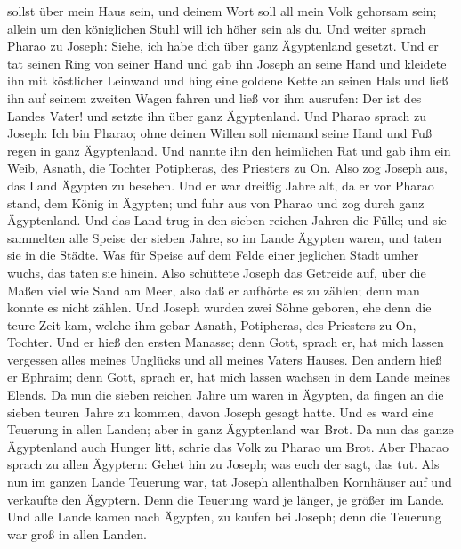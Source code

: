 sollst über mein Haus sein, und deinem Wort soll all mein Volk gehorsam
sein; allein um den königlichen Stuhl will ich höher sein als du.
 Und weiter sprach Pharao zu Joseph: Siehe, ich habe dich
über ganz Ägyptenland gesetzt.  Und er tat seinen Ring von
seiner Hand und gab ihn Joseph an seine Hand und kleidete ihn mit
köstlicher Leinwand und hing eine goldene Kette an seinen Hals
 und ließ ihn auf seinem zweiten Wagen fahren und ließ vor
ihm ausrufen: Der ist des Landes Vater! und setzte ihn über ganz
Ägyptenland.  Und Pharao sprach zu Joseph: Ich bin Pharao;
ohne deinen Willen soll niemand seine Hand und Fuß regen in ganz
Ägyptenland.  Und nannte ihn den heimlichen Rat und gab ihm
ein Weib, Asnath, die Tochter Potipheras, des Priesters zu On. Also zog
Joseph aus, das Land Ägypten zu besehen.  Und er war
dreißig Jahre alt, da er vor Pharao stand, dem König in Ägypten; und
fuhr aus von Pharao und zog durch ganz Ägyptenland.  Und
das Land trug in den sieben reichen Jahren die Fülle;  und
sie sammelten alle Speise der sieben Jahre, so im Lande Ägypten waren,
und taten sie in die Städte. Was für Speise auf dem Felde einer
jeglichen Stadt umher wuchs, das taten sie hinein.  Also
schüttete Joseph das Getreide auf, über die Maßen viel wie Sand am Meer,
also daß er aufhörte es zu zählen; denn man konnte es nicht zählen.
 Und Joseph wurden zwei Söhne geboren, ehe denn die teure
Zeit kam, welche ihm gebar Asnath, Potipheras, des Priesters zu On,
Tochter.  Und er hieß den ersten Manasse; denn Gott, sprach
er, hat mich lassen vergessen alles meines Unglücks und all meines
Vaters Hauses.  Den andern hieß er Ephraim; denn Gott,
sprach er, hat mich lassen wachsen in dem Lande meines Elends.
 Da nun die sieben reichen Jahre um waren in Ägypten,
 da fingen an die sieben teuren Jahre zu kommen, davon
Joseph gesagt hatte. Und es ward eine Teuerung in allen Landen; aber in
ganz Ägyptenland war Brot.  Da nun das ganze Ägyptenland
auch Hunger litt, schrie das Volk zu Pharao um Brot. Aber Pharao sprach
zu allen Ägyptern: Gehet hin zu Joseph; was euch der sagt, das tut.
 Als nun im ganzen Lande Teuerung war, tat Joseph
allenthalben Kornhäuser auf und verkaufte den Ägyptern. Denn die
Teuerung ward je länger, je größer im Lande.  Und alle
Lande kamen nach Ägypten, zu kaufen bei Joseph; denn die Teuerung war
groß in allen Landen.

